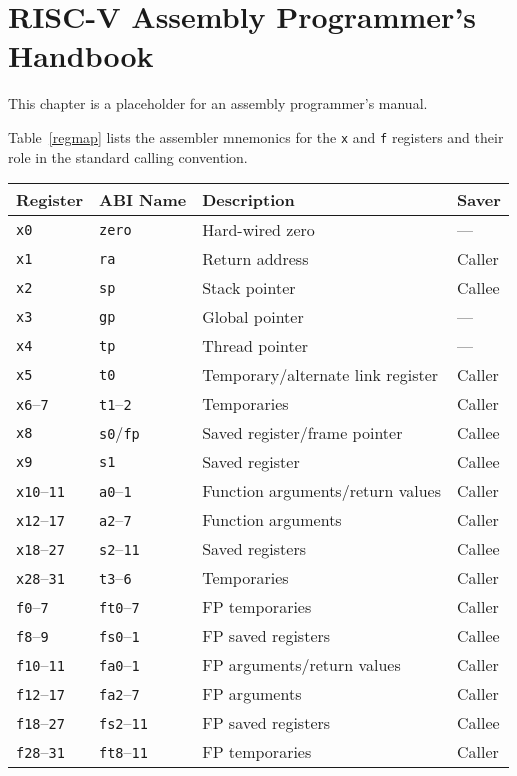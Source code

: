 \chapter{RISC-V Assembly Programmer's Handbook}
\label{assembly}

This chapter is a placeholder for an assembly programmer's manual.

Table~\ref{regmap} lists the assembler mnemonics for the {\tt x} and {\tt f}
registers and their role in the standard calling convention.

\vspace{0.2in}
\begin{table*}[htbp]
\begin{center}
\begin{tabular}{|l|l|l|l|}

  \hline
  Register            & ABI Name            & Description        & Saver \\ \hline
  \tt x0              & \tt zero            & Hard-wired zero    & --- \\
  \tt x1              & \tt ra              & Return address     & Caller \\
  \tt x2              & \tt sp              & Stack pointer      & Callee \\
  \tt x3              & \tt gp              & Global pointer     & --- \\
  \tt x4              & \tt tp              & Thread pointer     & --- \\
  \tt x5              & {\tt t0}            & Temporary/alternate link register& Caller \\
  {\tt x6}--{\tt 7}   & {\tt t1}--{\tt 2}   & Temporaries        & Caller \\
  \tt x8              & {\tt s0}/\tt fp     & Saved register/frame pointer & Callee \\
  \tt x9              & {\tt s1}            & Saved register     & Callee \\
  {\tt x10}--{\tt 11} & {\tt a0}--{\tt 1}   & Function arguments/return values & Caller \\
  {\tt x12}--{\tt 17} & {\tt a2}--{\tt 7}   & Function arguments & Caller \\
  {\tt x18}--{\tt 27} & {\tt s2}--{\tt 11}  & Saved registers    & Callee \\
  {\tt x28}--{\tt 31} & {\tt t3}--{\tt 6}   & Temporaries        & Caller \\
  \hline
  {\tt f0}--{\tt 7}   & {\tt ft0}--{\tt 7}  & FP temporaries     & Caller \\
  {\tt f8}--{\tt 9}   & {\tt fs0}--{\tt 1}  & FP saved registers & Callee \\
  {\tt f10}--{\tt 11} & {\tt fa0}--{\tt 1}  & FP arguments/return values & Caller \\
  {\tt f12}--{\tt 17} & {\tt fa2}--{\tt 7}  & FP arguments       & Caller \\
  {\tt f18}--{\tt 27} & {\tt fs2}--{\tt 11} & FP saved registers & Callee \\
  {\tt f28}--{\tt 31} & {\tt ft8}--{\tt 11} & FP temporaries     & Caller \\
  \hline


\end{tabular}
\end{center}
\end{table*}
